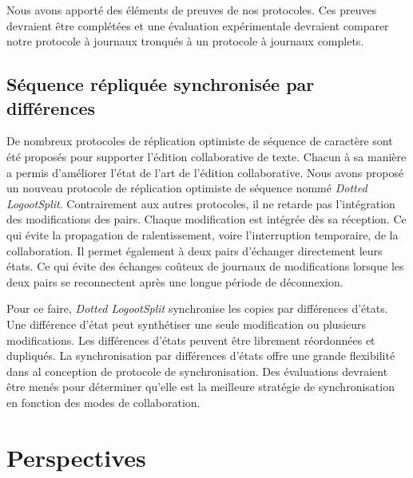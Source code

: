 Nous avons apporté des éléments de preuves de nos protocoles.
Ces preuves devraient être complétées et une évaluation expérimentale devraient comparer notre protocole à journaux tronqués à un protocole à journaux complets.


\subsection{Séquence répliquée synchronisée par différences}

De nombreux protocoles de réplication optimiste de séquence de caractère sont été proposés pour supporter l'édition collaborative de texte.
Chacun à sa manière a permis d'améliorer l'état de l'art de l'édition collaborative.
Nous avons proposé un nouveau protocole de réplication optimiste de séquence nommé \emph{Dotted LogootSplit}.
Contrairement aux autres protocoles, il ne retarde pas l'intégration des modifications des pairs.
Chaque modification est intégrée dès sa réception.
Ce qui évite la propagation de ralentissement, voire l'interruption temporaire, de la collaboration.
Il permet également à deux pairs d'échanger directement leurs états.
Ce qui évite des échanges coûteux de journaux de modifications lorsque les deux pairs se reconnectent après une longue période de déconnexion.

Pour ce faire, \emph{Dotted LogootSplit} synchronise les copies par différences d'états.
Une différence d'état peut synthétiser une seule modification ou plusieurs modifications.
Les différences d'états peuvent être librement réordonnées et dupliqués.
La synchronisation par différences d'états offre une grande flexibilité dans al conception de protocole de synchronisation.
Des évaluations devraient être menés pour déterminer qu'elle est la meilleure stratégie de synchronisation en fonction des modes de collaboration.


\section{Perspectives}


